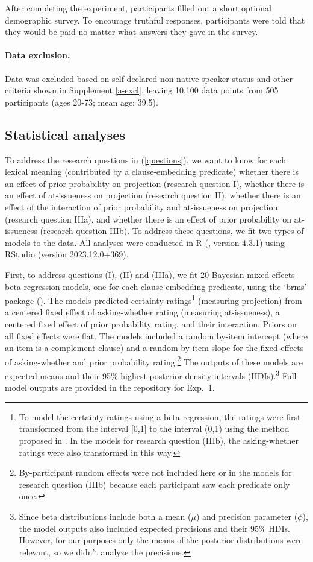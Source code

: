 \documentclass[11pt,fleqn]{article}
\newcommand{\6}{\mbox{$[\hspace*{-.6mm}[$}}
\newcommand{\9}{\mbox{$]\hspace*{-.6mm}]$}}
\begin{document}
After completing the experiment, participants filled out a short optional demographic survey. To encourage truthful responses, participants were told that they would be paid no matter what answers they gave in the survey.

\paragraph{Data exclusion.} Data was excluded based on self-declared non-native speaker status and other criteria shown in Supplement \ref{a-excl}, leaving 10,100 data points from 505 participants (ages 20-73; mean age: 39.5).

\subsection{Statistical analyses}\label{s:stats1}

To address the research questions in (\ref{questions}), we want to know for each lexical meaning (contributed by a clause-embedding predicate) whether there is an effect of prior probability on projection (research question I), whether there is an effect of at-issueness on projection (research question II), whether there is an effect of the interaction of prior probability and at-issueness on projection (research question IIIa), and whether there is an effect of prior probability on at-issueness (research question IIIb). To address these questions, we fit two types of models to the data. All analyses were conducted in R (\citealt{R}, version 4.3.1) using RStudio (version 2023.12.0+369).

First, to address questions (I), (II) and (IIIa), we fit 20 Bayesian mixed-effects beta regression models, one for each clause-embedding predicate, using the `brms' package (\citealt{buerkner2017}). The models predicted certainty ratings\footnote{To model the certainty ratings using a beta regression, the ratings were first transformed from the interval [0,1] to the interval (0,1) using the method proposed in \citealt{smithson-verkuilen2006}. In the models for research question (IIIb), the asking-whether ratings were also transformed in this way.} (measuring projection) from a centered fixed effect of asking-whether rating (measuring at-issueness), a centered fixed effect of prior probability rating, and their interaction. Priors on all fixed effects were flat.  The models included a random by-item intercept (where an item is a complement clause) and a random by-item slope for the fixed effects of asking-whether and prior probability rating.\footnote{By-participant random effects were not included here or in the models for research question (IIIb) because each participant saw each predicate only once.} The outputs of these models are expected means and their 95\% highest posterior density intervals (HDIs).\footnote{Since beta distributions include both a mean  ($\mu$) and precision parameter  ($\phi$), the model outputs also included expected precisions and their 95\% HDIs. However, for our purposes only  the means of the posterior distributions were relevant, so we didn't analyze the precisions.} Full model outputs are provided in the repository for Exp.~1.
\end{document}
